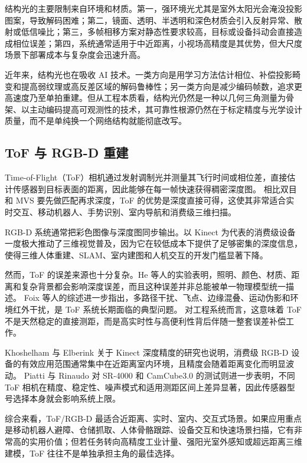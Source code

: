 \documentclass[12pt,a4paper]{ctexart}
\begin{document}
结构光的主要限制来自环境和材质。第一，强环境光尤其是室外太阳光会淹没投影图案，导致解码困难；第二，镜面、透明、半透明和深色材质会引入反射异常、散射或低信噪比；第三，多帧相移方案对静态性要求较高，目标或设备抖动会直接造成相位误差；第四，系统通常适用于中近距离，小视场高精度是其优势，但大尺度场景下部署成本与复杂度会迅速升高。\cite{salvi2010}

近年来，结构光也在吸收 AI 技术。一类方向是用学习方法估计相位、补偿投影畸变和提高弱纹理或高反差区域的解码鲁棒性；另一类方向是减少编码帧数，追求更高速度乃至单拍重建。但从工程本质看，结构光仍然是一种以几何三角测量为骨架、以主动编码提高可观测性的技术，其可靠性根源仍然在于标定精度与光学设计质量，而不是单纯换一个网络结构就能彻底改写。

\subsection{ToF 与 RGB-D 重建}

Time-of-Flight（ToF）相机通过发射调制光并测量其飞行时间或相位差，直接估计传感器到目标表面的距离，因此能够在每一帧快速获得稠密深度图。\cite{foix2011tof,he2017toferror} 相比双目和 MVS 要先做匹配再求深度，ToF 的优势是深度直接可得，这使其非常适合实时交互、移动机器人、手势识别、室内导航和消费级三维扫描。

RGB-D 系统通常把彩色图像与深度图同步输出。以 Kinect 为代表的消费级设备一度极大推动了三维视觉普及，因为它在较低成本下提供了足够密集的深度信息，使得三维人体重建、SLAM、室内建图和人机交互的开发门槛显著下降。\cite{khoshelham2012kinect}

然而，ToF 的误差来源也十分复杂。He 等人的实验表明，照明、颜色、材质、距离和复杂背景都会影响深度误差，而且这种误差并非总能被单一物理模型统一描述。\cite{he2017toferror} Foix 等人的综述进一步指出，多路径干扰、飞点、边缘混叠、运动伪影和环境红外干扰，是 ToF 系统长期面临的典型问题。\cite{foix2011tof} 对工程系统而言，这意味着 ToF 不是天然稳定的直接测距，而是高实时性与高便利性背后伴随一整套误差补偿工作。

Khoshelham 与 Elberink 关于 Kinect 深度精度的研究也说明，消费级 RGB-D 设备的有效应用范围通常集中在近距离室内环境，且精度会随着距离变化而明显波动。\cite{khoshelham2012kinect} Piatti 与 Rinaudo 对 SR-4000 和 CamCube3.0 的测试则进一步表明，不同 ToF 相机在精度、稳定性、噪声模式和适用测距区间上差异显著，因此传感器型号选择本身就会影响系统上限。\cite{piatti2012tof}

综合来看，ToF/RGB-D 最适合近距离、实时、室内、交互式场景。如果应用重点是移动机器人避障、仓储抓取、人体骨骼跟踪、设备交互和快速场景扫描，它有非常高的实用价值；但若任务转向高精度工业计量、强阳光室外感知或超远距离三维建模，ToF 往往不是单独承担主角的最佳选择。
\end{document}
